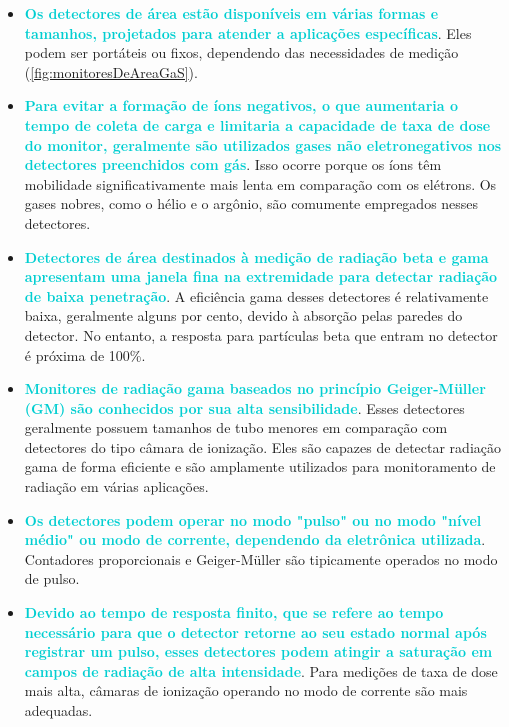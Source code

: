 \documentclass[11pt,a4paper]{article}
\newcounter{exemplo}
\begin{document}
	\begin{exemplo}
		\begin{itemize}
			\item \textcolor{DarkTurquoise}{\textbf{Os detectores de área estão disponíveis em várias formas e tamanhos, projetados para atender a aplicações específicas}}. Eles podem ser portáteis ou fixos, dependendo das necessidades de medição (\ref{fig:monitoresDeAreaGaS}).
			\item \textcolor{DarkTurquoise}{\textbf{Para evitar a formação de íons negativos, o que aumentaria o tempo de coleta de carga e limitaria a capacidade de taxa de dose do monitor, geralmente são utilizados gases não eletronegativos nos detectores preenchidos com gás}}. Isso ocorre porque os íons têm mobilidade significativamente mais lenta em comparação com os elétrons. Os gases nobres, como o hélio e o argônio, são comumente empregados nesses detectores.
			\item \textcolor{DarkTurquoise}{\textbf{Detectores de área destinados à medição de radiação beta e gama apresentam uma janela fina na extremidade para detectar radiação de baixa penetração}}. A eficiência gama desses detectores é relativamente baixa, geralmente alguns por cento, devido à absorção pelas paredes do detector. No entanto, a resposta para partículas beta que entram no detector é próxima de 100\%.
			\item \textcolor{DarkTurquoise}{\textbf{Monitores de radiação gama baseados no princípio Geiger-Müller (GM) são conhecidos por sua alta sensibilidade}}. Esses detectores geralmente possuem tamanhos de tubo menores em comparação com detectores do tipo câmara de ionização. Eles são capazes de detectar radiação gama de forma eficiente e são amplamente utilizados para monitoramento de radiação em várias aplicações. 
			\item  \textcolor{DarkTurquoise}{\textbf{Os detectores podem operar no modo "pulso" ou no modo "nível médio" ou modo de corrente, dependendo da eletrônica utilizada}}. Contadores proporcionais e Geiger-Müller são tipicamente operados no modo de pulso.
			\item \textcolor{DarkTurquoise}{\textbf{Devido ao tempo de resposta finito, que se refere ao tempo necessário para que o detector retorne ao seu estado normal após registrar um pulso, esses detectores podem atingir a saturação em campos de radiação de alta intensidade}}. Para medições de taxa de dose mais alta, câmaras de ionização operando no modo de corrente são mais adequadas.
		\end{itemize}
	\end{exemplo}
\end{document}

